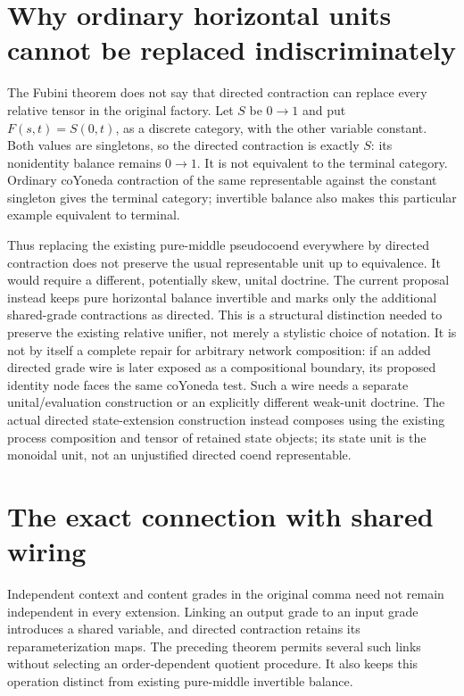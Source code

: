 \documentclass[11pt]{article}
\begin{document}
\section{Why ordinary horizontal units cannot be replaced indiscriminately}
The Fubini theorem does not say that directed contraction can replace every relative tensor in the original factory. Let $S$ be $0\to1$ and put $F(s,t)=S(0,t)$, as a discrete category, with the other variable constant. Both values are singletons, so the directed contraction is exactly $S$: its nonidentity balance remains $0\to1$. It is not equivalent to the terminal category. Ordinary coYoneda contraction of the same representable against the constant singleton gives the terminal category; invertible balance also makes this particular example equivalent to terminal.

Thus replacing the existing pure-middle pseudocoend everywhere by directed contraction does not preserve the usual representable unit up to equivalence. It would require a different, potentially skew, unital doctrine. The current proposal instead keeps pure horizontal balance invertible and marks only the additional shared-grade contractions as directed. This is a structural distinction needed to preserve the existing relative unifier, not merely a stylistic choice of notation. It is not by itself a complete repair for arbitrary network composition: if an added directed grade wire is later exposed as a compositional boundary, its proposed identity node faces the same coYoneda test. Such a wire needs a separate unital/evaluation construction or an explicitly different weak-unit doctrine. The actual directed state-extension construction instead composes using the existing process composition and tensor of retained state objects; its state unit is the monoidal unit, not an unjustified directed coend representable.

\section{The exact connection with shared wiring}
Independent context and content grades in the original comma need not remain independent in every extension. Linking an output grade to an input grade introduces a shared variable, and directed contraction retains its reparameterization maps. The preceding theorem permits several such links without selecting an order-dependent quotient procedure. It also keeps this operation distinct from existing pure-middle invertible balance.
\end{document}
